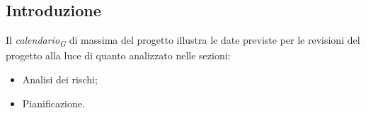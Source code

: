 \subsection{Introduzione}
Il \textit{calendario}\textsubscript{\textit{G}} di massima del progetto illustra le date previste per le revisioni del progetto
alla luce di quanto analizzato nelle sezioni: 
\begin{itemize}
    \item Analisi dei rischi;
    \item Pianificazione.
\end{itemize}